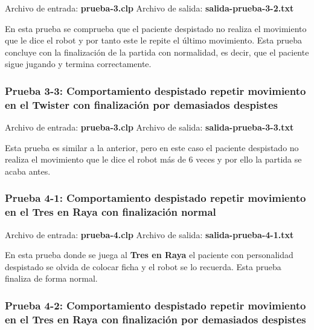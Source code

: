 \documentclass{uc3mpracticas}
\begin{document}
  Archivo de entrada: \textbf{prueba-3.clp} \hspace{15mm} Archivo de salida: \textbf{salida-prueba-3-2.txt}

  \vspace{2mm}

  En esta prueba se comprueba que el paciente despistado no realiza el movimiento que le dice el robot y por tanto este le repite el último movimiento. Esta prueba concluye con la finalización de la partida con normalidad, es decir, que el paciente sigue jugando y termina correctamente.


  \subsubsection{Prueba 3-3: Comportamiento despistado repetir movimiento en el Twister con finalización por demasiados despistes}


  Archivo de entrada: \textbf{prueba-3.clp} \hspace{15mm} Archivo de salida: \textbf{salida-prueba-3-3.txt}

  \vspace{2mm}

  Esta prueba es similar a la anterior, pero en este caso el paciente despistado no realiza el movimiento que le dice el robot más de 6 veces y por ello la partida se acaba antes.



  \subsubsection{Prueba 4-1: Comportamiento despistado repetir movimiento en el Tres en Raya con finalización normal}


  Archivo de entrada: \textbf{prueba-4.clp} \hspace{15mm} Archivo de salida: \textbf{salida-prueba-4-1.txt}

  \vspace{2mm}

  En esta prueba donde se juega al \textbf{Tres en Raya} el paciente con personalidad despistado se olvida de colocar ficha y el robot se lo recuerda. Esta prueba finaliza de forma normal.


  \subsubsection{Prueba 4-2: Comportamiento despistado repetir movimiento en el Tres en Raya con finalización por demasiados despistes}
\end{document}
